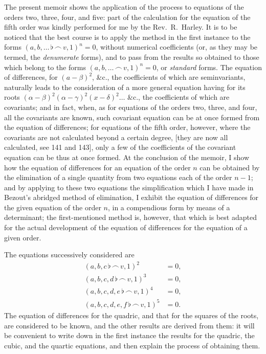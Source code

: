 \documentclass[11pt,a4paper]{book}
\begin{document}
The present memoir shows the application of the process to equations of the orders two, three, four, and five: part of the calculation for the equation of the fifth order was kindly performed for me by the Rev.~R.~Harley. It is to be noticed that the best course is to apply the method in the first instance to the forms $(a,b,\ldots\,\flat\,\frown\, v,1)^n=0$, without numerical coefficients (or, as they may be termed, the \textit{denumerate} forms), and to pass from the results so obtained to those which belong to the forms $(a,b,\ldots\,\frown\, v,1)^n=0$, or \textit{standard} forms. The equation of differences, for $(a-\beta)^2$, \&c., the coefficients of which are seminvariants, naturally leads to the consideration of a more general equation having for its roots $(\alpha-\beta)^2(\alpha-\gamma)^2(x-\delta)^2\ldots$ \&c., the coefficients of which are covariants; and in fact, when, as for equations of the orders two, three, and four, all the covariants are known, such covariant equation can be at once formed from the equation of differences; for equations of the fifth order, however, where the covariants are not calculated beyond a certain degree, [they are now all calculated, see 141 and 143], only a few of the coefficients of the covariant equation can be thus at once formed. At the conclusion of the memoir, I show how the equation of differences for an equation of the order $n$ can be obtained by the elimination of a single quantity from two equations each of the order $n-1$; and by applying to these two equations the simplification which I have made in Bezout's abridged method of elimination, I exhibit the equation of differences for the given equation of the order $n$, in a compendious form by means of a determinant; the first-mentioned method is, however, that which is best adapted for the actual development of the equation of differences for the equation of a given order.

\vspace{6pt}

The equations successively considered are
\begin{align*}
(a,b,c\,\flat\,\frown\, v,1)^2 &= 0,\\
(a,b,c,d\,\flat\,\frown\, v,1)^3 &= 0,\\
(a,b,c,d,e\,\flat\,\frown\, v,1)^4 &= 0,\\
(a,b,c,d,e,f\,\flat\,\frown\, v,1)^5 &= 0.
\end{align*}
The equation of differences for the quadric, and that for the squares of the roots, are considered to be known, and the other results are derived from them: it will be convenient to write down in the first instance the results for the quadric, the cubic, and the quartic equations, and then explain the process of obtaining them.
\end{document}
